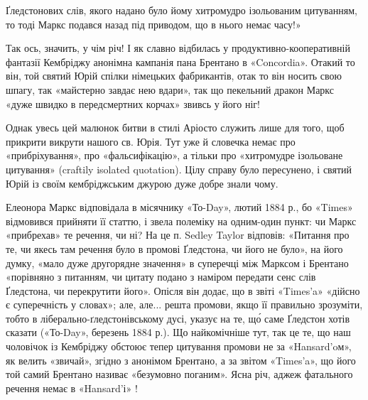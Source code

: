 \parcont{}  %
Ґледстонових слів, якого надано було йому хитромудро ізольованим цитуванням, то тоді Маркс подався
назад під приводом, що в нього немає часу!»

Так ось, значить, у чім річ! І як славно відбилась у продуктивно-кооперативній
фантазії Кембріджу анонімна кампанія пана Брентано в «Concordia». Отакий то він, той святий Юрій
спілки німецьких фабрикантів, отак то він носить свою шпагу, так «майстерно завдає нею вдари», так
що пекельний дракон Маркс «дуже швидко в передсмертних корчах» звивсь у його ніг!

Однак увесь цей малюнок битви в стилі Аріосто служить лише для того, щоб прикрити викрути нашого св.
Юрія. Тут уже й словечка немає про «прибріхування», про «фальсифікацію», а тільки про «хитромудре
ізольоване цитування» (craftily
isolated quotation). Цілу справу було пересунено, і святий Юрій із своїм кембріджським джурою дуже
добре знали чому.

Елеонора Маркс відповідала в місячнику «То-Day», лютий 1884 р., бо «Times» відмовився прийняти її
статтю, і звела полеміку на одним-один пункт: чи Маркс «прибрехав» те речення, чи ні? На це п.
Sedley Taylor відповів: «Питання про те, чи
якесь там речення було в промові Ґледстона, чи його не було», на його думку, «мало дуже другорядне
значення» в суперечці між Марксом і Брентано «порівняно з питанням, чи цитату подано з наміром
передати сенс слів Ґледстона, чи перекрутити
його». Опісля він додає, що в звіті «Times’a» «дійсно є суперечність у словах»; але, але... решта
промови, якщо її правильно зрозуміти, тобто в ліберально-ґледстонівському дусі, указує на те, що́
саме Ґледстон хотів сказати («То-Day», березень 1884 р.). Що найкомічніше тут, так це те, що наш
чоловічок із Кембріджу обстоює тепер цитування промови не за «Hansard’oм», як велить «звичай»,
згідно з анонімом Брентано, а за звітом «Times’a», що його той самий Брентано називає «безумовно
поганим». Ясна річ, аджеж фатального речення немає в «Hansard’і» !

